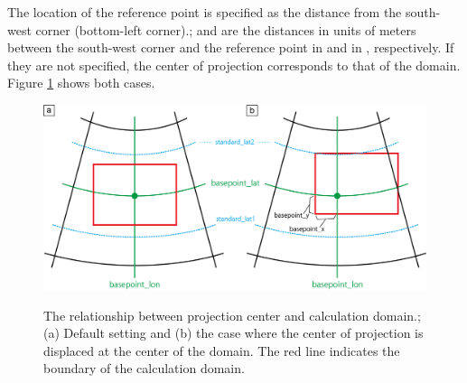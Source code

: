 The location of the reference point is specified as the distance from the south-west corner (bottom-left corner).;
 and  are the distances in units of meters between the south-west corner and the reference point in \XDIR and in \YDIR, respectively.
If they are not specified, the center of projection corresponds to that of the domain.
Figure \ref{fig:map_lc} shows both cases.

\begin{figure}[t]
\begin{center}
  \includegraphics[width=0.8\hsize]{./figure/LC_latlon_xy.png}\\
  \caption{The relationship between projection center and calculation domain.; (a) Default setting and (b) the case where the center of projection is displaced at the center of the domain.
    The red line indicates the boundary of the calculation domain.}
  \label{fig:map_lc}
\end{center}
\end{figure}

